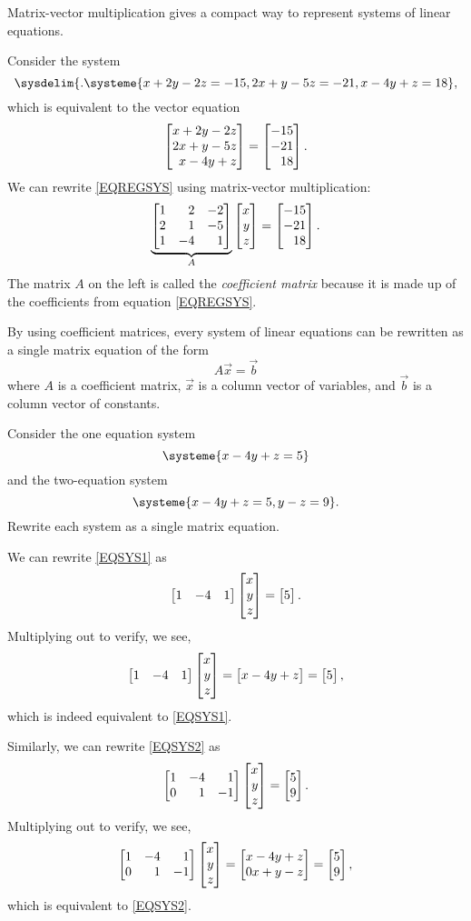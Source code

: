 Matrix-vector multiplication gives a compact way to represent systems of linear equations.

Consider the system
\begin{equation}
	\label{EQREGSYS}
	\sysdelim\{.
		\systeme{
			x+2y-2z=-15,
			2x+y-5z=-21,
			x-4y+z=18
		},
\end{equation}
which is equivalent to the vector equation
\[
	\mat{x+2y-2z\\
           2x+y-5z\\
	     x-4y+z}=\mat{-15\\-21\\18}.
\]
We can rewrite \eqref{EQREGSYS} using matrix-vector multiplication:
\[
	\underbrace{\mat{1&2&-2\\2&1&-5\\1&-4&1}}_{A}\mat{x\\y\\z}=\mat{-15\\-21\\18}.
\]
The matrix $A$ on the left is called the \emph{coefficient matrix} because it
is made up of the coefficients from equation \eqref{EQREGSYS}.

\medskip
By using coefficient matrices, every system of linear equations can be rewritten as a single matrix equation
of the form
\[
	A\vec x=\vec b
\]
where $A$ is a coefficient matrix, $\vec x$ is a column vector of variables, and $\vec b$
is a column vector of constants.

\begin{example}
	Consider the one equation system
	\begin{equation}
		\label{EQSYS1}
		\systeme{x-4y+z=5}
	\end{equation}
	and the two-equation system
	\begin{equation}
		\label{EQSYS2}
		\systeme{x-4y+z=5, y-z=9}.
	\end{equation}
	Rewrite each system as a single matrix equation.

	We can rewrite \eqref{EQSYS1} as
	\[
        \mat{1&-4&1}\mat{x\\y\\z}=\mat{5}.
    \]
    Multiplying out to verify, we see,
    \[
        \mat{1&-4&1}\mat{x\\y\\z}=\mat{x-4y+z}=\mat{5},
    \]
    which is indeed equivalent to \eqref{EQSYS1}.

	Similarly, we can rewrite \eqref{EQSYS2} as
	\[
       \mat{1&-4&1\\0&1&-1}\mat{x\\y\\z}=\mat{5\\9}.
    \]
    Multiplying out to verify, we see,
    \[
       \mat{1&-4&1\\0&1&-1}\mat{x\\y\\z}=\mat{x-4y+z\\0x+y-z}=\mat{5\\9},
    \]
    which is equivalent to \eqref{EQSYS2}.
\end{example}

